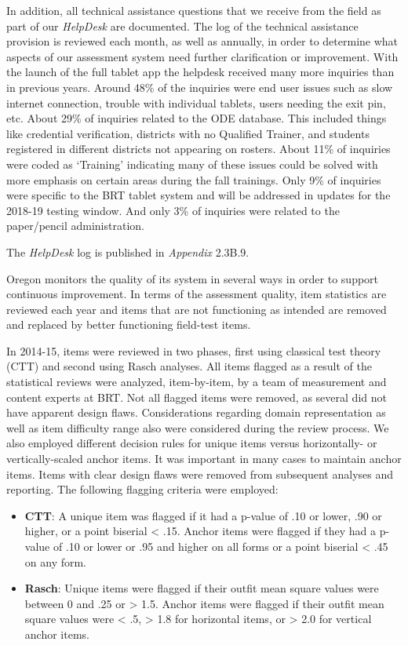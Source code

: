 \documentclass[]{article}
\providecommand{\tightlist}{%
  \setlength{\itemsep}{0pt}\setlength{\parskip}{0pt}}
\begin{document}
In addition, all technical assistance questions that we receive from the
field as part of our \emph{HelpDesk} are documented. The log of the
technical assistance provision is reviewed each month, as well as
annually, in order to determine what aspects of our assessment system
need further clarification or improvement. With the launch of the full
tablet app the helpdesk received many more inquiries than in previous
years. Around 48\% of the inquiries were end user issues such as slow
internet connection, trouble with individual tablets, users needing the
exit pin, etc. About 29\% of inquiries related to the ODE database. This
included things like credential verification, districts with no
Qualified Trainer, and students registered in different districts not
appearing on rosters. About 11\% of inquiries were coded as `Training'
indicating many of these issues could be solved with more emphasis on
certain areas during the fall trainings. Only 9\% of inquiries were
specific to the BRT tablet system and will be addressed in updates for
the 2018-19 testing window. And only 3\% of inquiries were related to
the paper/pencil administration.

The \emph{HelpDesk} log is published in \emph{Appendix} 2.3B.9.

Oregon monitors the quality of its system in several ways in order to
support continuous improvement. In terms of the assessment quality, item
statistics are reviewed each year and items that are not functioning as
intended are removed and replaced by better functioning field-test
items.

In 2014-15, items were reviewed in two phases, first using classical
test theory (CTT) and second using Rasch analyses. All items flagged as
a result of the statistical reviews were analyzed, item-by-item, by a
team of measurement and content experts at BRT. Not all flagged items
were removed, as several did not have apparent design flaws.
Considerations regarding domain representation as well as item
difficulty range also were considered during the review process. We also
employed different decision rules for unique items versus horizontally-
or vertically-scaled anchor items. It was important in many cases to
maintain anchor items. Items with clear design flaws were removed from
subsequent analyses and reporting. The following flagging criteria were
employed:

\begin{itemize}
\tightlist
\item
  \textbf{CTT}: A unique item was flagged if it had a p-value of .10 or
  lower, .90 or higher, or a point biserial \textless{} .15. Anchor
  items were flagged if they had a p-value of .10 or lower or .95 and
  higher on all forms or a point biserial \textless{} .45 on any form.
\item
  \textbf{Rasch}: Unique items were flagged if their outfit mean square
  values were between 0 and .25 or \textgreater{} 1.5. Anchor items were
  flagged if their outfit mean square values were \textless{} .5,
  \textgreater{} 1.8 for horizontal items, or \textgreater{} 2.0 for
  vertical anchor items.
\end{itemize}
\end{document}
